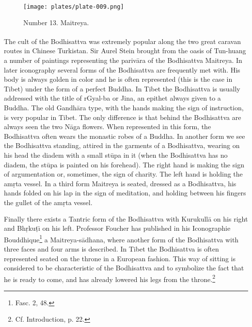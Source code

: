 \documentclass[a4paper, 12pt, oneside]{article}
\begin{document}
\clearpage
\vspace*{\fill}
\begin{figure}[H]
\centering
\texttt{[image: plates/plate-009.png]}
\caption*{Number 13. Maitreya.}
\end{figure}
\vspace*{\fill}
\clearpage
\paragraph{}
The cult of the Bodhisattva was extremely popular along the two great caravan routes in Chinese Turkistan. Sir Aurel Stein brought from the oasis of Tun-huang a number of paintings representing the pariv\={a}ra of the Bodhisattva Maitreya. In later iconography several forms of the Bodhisattva are frequently met with. His body is always golden in color and he is often represented (this is the case in Tibet) under the form of a perfect Buddha. In Tibet the Bodhisattva is usually addressed with the title of rGyal-ba or Jina, an epithet always given to a Buddha. The old Gandh\={a}ra type, with the hands making the sign of instruction, is very popular in Tibet. The only difference is that behind the Bodhisattva are always seen the two N\={a}ga flowers. When represented in this form, the Bodhisattva often wears the monastic robes of a Buddha. In another form we see the Bodhisattva standing, attired in the garments of a Bodhisattva, wearing on his head the diadem with a small st\={u}pa in it (when the Bodhisattva has no diadem, the st\={u}pa is painted on his forehead). The right hand is making the sign of argumentation or, sometimes, the sign of charity. The left hand is holding the am\d{r}ta vessel. In a third form Maitreya is seated, dressed as a Bodhisattva, his hands folded on his lap in the sign of meditation, and holding between his fingers the gullet of the am\d{r}ta vessel.

Finally there exists a Tantric form of the Bodhisattva with Kurukull\={a} on his right and Bh\d{r}ku\d{t}\={\i} on his left. Professor Foucher has published in his Iconographie Bouddhique\footnote{Fasc. 2, 48.} a Maitreya-s\={a}dhana, where another form of the Bodhisattva with three faces and four arms is described. In Tibet the Bodhisattva is often represented seated on the throne in a European fashion. This way of sitting is considered to be characteristic of the Bodhisattva and to symbolize the fact that he is ready to come, and has already lowered his legs from the throne.\footnote{Cf. Introduction, p. 22.}
\end{document}
